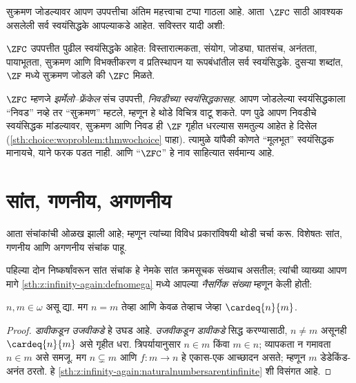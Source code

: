 सुक्रमण जोडल्यावर आपण उपपत्तीचा अंतिम महत्त्वाचा टप्पा गाठला आहे. आता~$\ZFC$ साठी आवश्यक असलेली सर्व स्वयंसिद्धके आपल्याकडे आहेत. सविस्तर यादी अशी:

\begin{defn}
$\ZFC$ उपपत्तीत पुढील स्वयंसिद्धके आहेत: विस्तारात्मकता, संयोग, जोड्या, घातसंच, अनंतता, पायाभूतता, सुक्रमण आणि विभक्तीकरण व प्रतिस्थापन या रूपबंधांतील सर्व स्वयंसिद्धके. दुसऱ्या शब्दांत, $\ZF$ मध्ये सुक्रमण जोडले की $\ZFC$ मिळते.
\end{defn}

$\ZFC$ म्हणजे \emph{झर्मेलो--फ्रेंकेल} संच उपपत्ती, \emph{निवडीच्या स्वयंसिद्धकासह}. आपण जोडलेल्या स्वयंसिद्धकाला “निवड” नव्हे तर “सुक्रमण” म्हटले, म्हणून हे थोडे विचित्र वाटू शकते. पण पुढे आपण {निवडीचे स्वयंसिद्धक} मांडल्यावर, सुक्रमण आणि निवड ही $\ZF$ गृहीत धरल्यास समतुल्य आहेत हे दिसेल (\ref{sth:choice:woproblem:thmwochoice} पाहा). त्यामुळे यांपैकी कोणते “मूलभूत” स्वयंसिद्धक मानायचे, याने फरक पडत नाही. आणि “$\ZFC$” हे नाव साहित्यात सर्वमान्य आहे.







\section{सांत, गणनीय, अगणनीय}\label{sth:cardinals:classing:sec}

आता संचांकांची ओळख झाली आहे; म्हणून त्यांच्या विविध प्रकारांविषयी थोडी चर्चा करू. विशेषतः सांत, गणनीय आणि अगणनीय संचांक पाहू.

पहिल्या दोन निष्कर्षांवरून सांत संचांक हे नेमके सांत क्रमसूचक संख्याच असतील; त्यांची व्याख्या आपण मागे \ref{sth:z:infinity-again:defnomega} मध्ये आपल्या \emph{नैसर्गिक संख्या} म्हणून केली होती:

\begin{prop}\label{sth:cardinals:classing:finitecardisoequal}
$n, m \in \omega$ असू द्या. मग $n = m$ तेव्हा आणि केवळ तेव्हाच जेव्हा $\cardeq{n}{m}$.
\end{prop}

\begin{proof}
\emph{डावीकडून उजवीकडे} हे उघड आहे. \emph{उजवीकडून डावीकडे} सिद्ध करण्यासाठी, $n \neq m$ असूनही $\cardeq{n}{m}$ असे गृहीत धरा. त्रिपर्यायानुसार $n \in m$ किंवा $m \in n$; व्यापकता न गमावता $n \in m$ असे समजू. मग $n \subsetneq m$ आणि $f \colon m \to n$ हे एकास-एक आच्छादन असते; म्हणून $m$ डेडेकिंड-अनंत ठरतो. हे \ref{sth:z:infinity-again:naturalnumbersarentinfinite} शी विसंगत आहे.
\end{proof}


